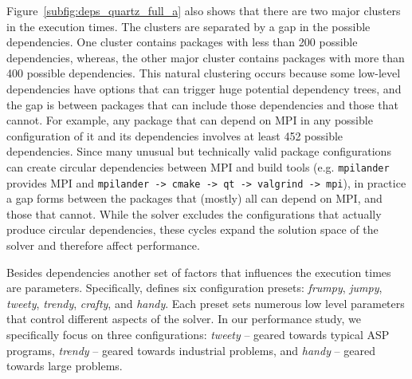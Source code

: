 Figure~\ref{subfig:deps_quartz_full_a} also shows that there are two major clusters in
the execution times. The clusters are separated by a gap in the possible dependencies.
One cluster contains packages with less than 200 possible dependencies, whereas, the
other major cluster contains packages with more than 400 possible dependencies. This
natural clustering occurs because some low-level dependencies have options that can
trigger huge potential dependency trees, and the gap is between packages that can
include those dependencies and those that cannot. For example, any package that can
depend on MPI in any possible configuration of it and its dependencies involves at least
452 possible dependencies. Since many unusual but technically valid package
configurations can create circular dependencies between MPI and build tools (e.g.
\texttt{mpilander} provides MPI and \texttt{mpilander -> cmake -> qt -> valgrind ->
  mpi}), in practice a gap forms between the packages that (mostly) all can depend on
MPI, and those that cannot. While the solver excludes the configurations that actually
produce circular dependencies, these cycles expand the solution space of the solver and
therefore affect performance.



% 

% 

% 

Besides dependencies another set of factors that influences the execution times are
\clingo{} parameters. Specifically, \clingo{} defines six configuration presets:
\emph{frumpy}, \emph{jumpy}, \emph{tweety}, \emph{trendy}, \emph{crafty}, and
\emph{handy}. Each preset sets numerous low level parameters that control different
aspects of the solver. In our performance study, we specifically focus on three
configurations: \emph{tweety} -- geared towards typical ASP programs, \emph{trendy} --
geared towards industrial problems, and \emph{handy} -- geared towards large problems.

